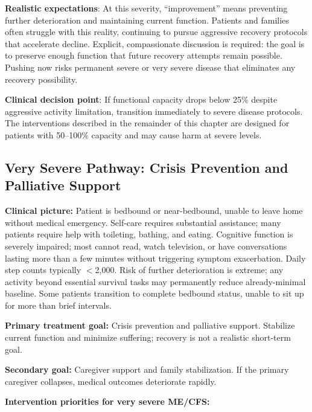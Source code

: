\textbf{Realistic expectations}: At this severity, ``improvement'' means preventing further deterioration and maintaining current function. Patients and families often struggle with this reality, continuing to pursue aggressive recovery protocols that accelerate decline. Explicit, compassionate discussion is required: the goal is to preserve enough function that future recovery attempts remain possible. Pushing now risks permanent severe or very severe disease that eliminates any recovery possibility.

\textbf{Clinical decision point}: If functional capacity drops below 25\% despite aggressive activity limitation, transition immediately to severe disease protocols. The interventions described in the remainder of this chapter are designed for patients with 50--100\% capacity and may cause harm at severe levels.

\subsection{Very Severe Pathway: Crisis Prevention and Palliative Support}
\label{sec:pathway-very-severe}

\begin{keypoint}
\textbf{Clinical picture:} Patient is bedbound or near-bedbound, unable to leave home without medical emergency. Self-care requires substantial assistance; many patients require help with toileting, bathing, and eating. Cognitive function is severely impaired; most cannot read, watch television, or have conversations lasting more than a few minutes without triggering symptom exacerbation. Daily step counts typically $<$2,000. Risk of further deterioration is extreme; any activity beyond essential survival tasks may permanently reduce already-minimal baseline. Some patients transition to complete bedbound status, unable to sit up for more than brief intervals.

\textbf{Primary treatment goal:} Crisis prevention and palliative support. Stabilize current function and minimize suffering; recovery is not a realistic short-term goal.

\textbf{Secondary goal:} Caregiver support and family stabilization. If the primary caregiver collapses, medical outcomes deteriorate rapidly.
\end{keypoint}

\textbf{Intervention priorities for very severe ME/CFS:}

